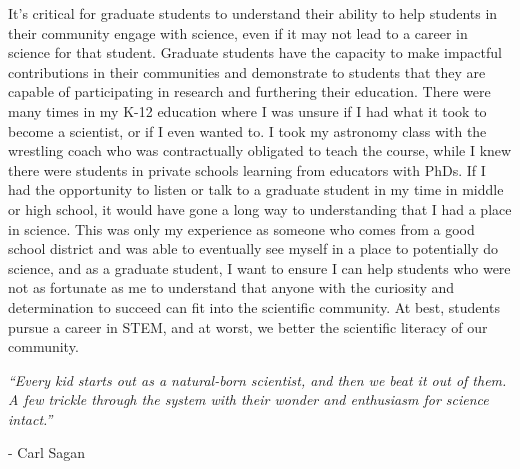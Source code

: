 \documentclass[11pt,letterpaper]{article}
\begin{document}
It’s critical for graduate students to understand their ability to help students in their community engage with science, even if it may not lead to a career in science for that student. Graduate students have the capacity to make impactful contributions in their communities and demonstrate to students that they are capable of participating in research and furthering their education. There were many times in my K-12 education where I was unsure if I had what it took to become a scientist, or if I even wanted to. I took my astronomy class with the wrestling coach who was contractually obligated to teach the course, while I knew there were students in private schools learning from educators with PhDs. If I had the opportunity to listen or talk to a graduate student in my time in middle or high school, it would have gone a long way to understanding that I had a place in science. This was only my experience as someone who comes from a good school district and was able to eventually see myself in a place to potentially do science, and as a graduate student, I want to ensure I can help students who were not as fortunate as me to understand that anyone with the curiosity and determination to succeed can fit into the scientific community. At best, students pursue a career in STEM, and at worst, we better the scientific literacy of our community. 

\textit{“Every kid starts out as a natural-born scientist, and then we beat it out of them. A few trickle through the system with their wonder and enthusiasm for science intact.”}

- Carl Sagan
\end{document}
